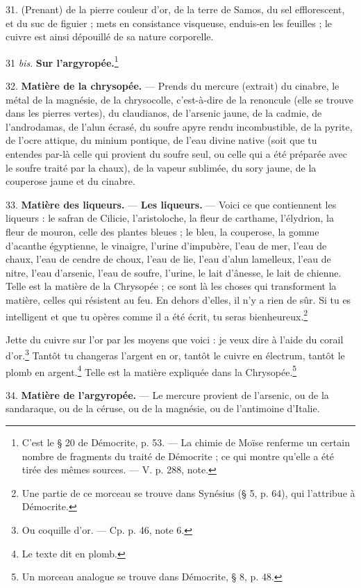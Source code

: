 \documentclass[a4paper, 11pt, oneside, polutonikogreek, french]{article}
\begin{document}
31. (Prenant) de la pierre couleur d'or, de la terre de Samos, du sel efflorescent, et du suc de figuier ; mets en consistance visqueuse, enduis-en les feuilles ; le cuivre est ainsi dépouillé de sa nature corporelle.

31 \emph{bis}. \textbf{Sur l'argyropée.}\footnote{C'est le § 20 de Démocrite, p. 53. --- La chimie de Moïse renferme un certain nombre de fragments du traité de Démocrite ; ce qui montre qu'elle a été tirée des mêmes sources. --- V. p. 288, note.}

32. \textbf{Matière de la chrysopée.} --- Prends du mercure (extrait) du cinabre, le métal de la magnésie, de la chrysocolle, c'est-à-dire de la renoncule (elle se trouve dans les pierres vertes), du claudianos, de l'arsenic jaune, de la cadmie, de l'androdamas, de l'alun écrasé, du soufre apyre rendu incombustible, de la pyrite, de l'ocre attique, du minium pontique, de l'eau divine native (soit que tu entendes par-là celle qui provient du soufre seul, ou celle qui a été préparée avec le soufre traité par la chaux), de la vapeur sublimée, du sory jaune, de la couperose jaune et du cinabre.

33. \textbf{Matière des liqueurs.} --- \textbf{Les liqueurs.} --- Voici ce que contiennent les liqueurs : le safran de Cilicie, l'aristoloche, la fleur de carthame, l'élydrion, la fleur de mouron, celle des plantes bleues ; le bleu, la couperose, la gomme d'acanthe égyptienne, le vinaigre, l'urine d'impubère, l'eau de mer, l'eau de chaux, l'eau de cendre de choux, l'eau de lie, l'eau d'alun lamelleux, l'eau de nitre, l'eau d'arsenic, l'eau de soufre, l'urine, le lait d'ânesse, le lait de chienne. Telle est la matière de la Chrysopée ; ce sont là les choses qui transforment la matière, celles qui résistent au feu. En dehors d'elles, il n'y a rien de sûr. Si tu es intelligent et que tu opères comme il a été écrit, tu seras bienheureux.\footnote{Une partie de ce morceau se trouve dans Synésius (§ 5, p. 64), qui l'attribue à Démocrite.}

Jette du cuivre sur l'or par les moyens que voici : je veux dire à l'aide du corail d'or.\footnote{Ou coquille d'or. --- Cp. p. 46, note 6.} Tantôt tu changeras l'argent en or, tantôt le cuivre en électrum, tantôt le plomb en argent.\footnote{Le texte dit en plomb.} Telle est la matière expliquée dans la Chrysopée.\footnote{Un morceau analogue se trouve dans Démocrite, § 8, p. 48.}

34. \textbf{Matière de l'argyropée.} --- Le mercure provient de l'arsenic, ou de la sandaraque, ou de la céruse, ou de la magnésie, ou de l'antimoine d'Italie.
\end{document}
